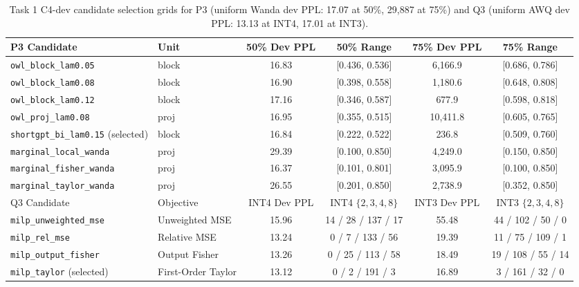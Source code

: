 \documentclass{article}
\begin{document}
\begin{table}[H]
\centering\footnotesize
\caption{Task 1 C4-dev candidate selection grids for P3 (uniform Wanda dev PPL: 17.07 at 50\%, 29,887 at 75\%) and Q3 (uniform AWQ dev PPL: 13.13 at INT4, 17.01 at INT3).}
\label{tab:t1dev}
\begin{tabular}{llcccc}
\toprule
P3 Candidate & Unit & 50\% Dev PPL & 50\% Range & 75\% Dev PPL & 75\% Range \\
\midrule
\texttt{owl\_block\_lam0.05} & block & 16.83 & [0.436, 0.536] & 6,166.9 & [0.686, 0.786] \\
\texttt{owl\_block\_lam0.08} & block & 16.90 & [0.398, 0.558] & 1,180.6 & [0.648, 0.808] \\
\texttt{owl\_block\_lam0.12} & block & 17.16 & [0.346, 0.587] & 677.9 & [0.598, 0.818] \\
\texttt{owl\_proj\_lam0.08} & proj & 16.95 & [0.355, 0.515] & 10,411.8 & [0.605, 0.765] \\
\texttt{shortgpt\_bi\_lam0.15} (selected) & block & 16.84 & [0.222, 0.522] & 236.8 & [0.509, 0.760] \\
\texttt{marginal\_local\_wanda} & proj & 29.39 & [0.100, 0.850] & 4,249.0 & [0.150, 0.850] \\
\texttt{marginal\_fisher\_wanda} & proj & 16.37 & [0.101, 0.801] & 3,095.9 & [0.100, 0.850] \\
\texttt{marginal\_taylor\_wanda} & proj & 26.55 & [0.201, 0.850] & 2,738.9 & [0.352, 0.850] \\
\midrule
Q3 Candidate & Objective & INT4 Dev PPL & INT4 $\{2,3,4,8\}$ & INT3 Dev PPL & INT3 $\{2,3,4,8\}$ \\
\midrule
\texttt{milp\_unweighted\_mse} & Unweighted MSE & 15.96 & 14 / 28 / 137 / 17 & 55.48 & 44 / 102 / 50 / 0 \\
\texttt{milp\_rel\_mse} & Relative MSE & 13.24 & 0 / 7 / 133 / 56 & 19.39 & 11 / 75 / 109 / 1 \\
\texttt{milp\_output\_fisher} & Output Fisher & 13.26 & 0 / 25 / 113 / 58 & 18.49 & 19 / 108 / 55 / 14 \\
\texttt{milp\_taylor} (selected) & First-Order Taylor & 13.12 & 0 / 2 / 191 / 3 & 16.89 & 3 / 161 / 32 / 0 \\
\bottomrule
\end{tabular}
\end{table}
\end{document}
